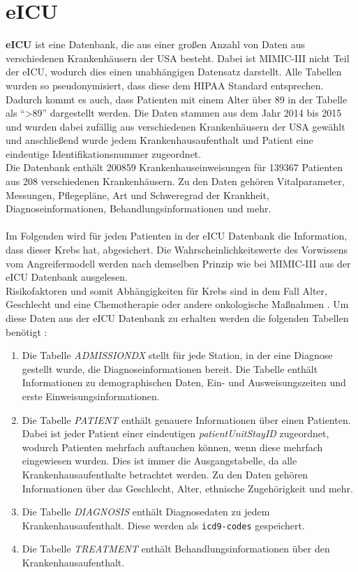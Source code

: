 \documentclass[german,version-2020-11]{uzl-thesis}
\begin{document}
\section{eICU}
\textbf{eICU} ist eine Datenbank, die aus einer großen Anzahl von Daten aus verschiedenen Krankenhäusern der USA besteht. Dabei ist MIMIC-III nicht Teil der eICU, wodurch dies einen unabhängigen Datensatz darstellt. Alle Tabellen wurden so pseudonymisiert, dass diese dem HIPAA Standard entsprechen. Dadurch kommt es auch, dass Patienten mit einem Alter über 89 in der Tabelle als \enquote{>89} dargestellt werden. Die Daten stammen aus dem Jahr 2014 bis 2015 und wurden dabei zufällig aus verschiedenen Krankenhäusern der USA gewählt und anschließend wurde jedem Krankenhausaufenthalt und Patient eine eindeutige Identifikationsnummer zugeordnet. \\ 
Die Datenbank enthält 200859 Krankenhauseinweisungen für 139367 Patienten aus 208 verschiedenen Krankenhäusern. Zu den Daten gehören Vitalparameter, Messungen, Pflegepläne, Art und Schweregrad der Krankheit, Diagnoseinformationen, Behandlungsinformationen und mehr. \\ \\
Im Folgenden wird für jeden Patienten in der eICU Datenbank die Information, dass dieser Krebs hat, abgesichert. Die Wahrscheinlichkeitswerte des Vorwissens vom Angreifermodell werden nach demselben Prinzip wie bei MIMIC-III aus der eICU Datenbank ausgelesen. \\ 
Risikofaktoren und somit Abhängigkeiten für Krebs sind in dem Fall Alter, Geschlecht und eine Chemotherapie oder andere onkologische Maßnahmen \cite{13,14}. Um diese Daten aus der eICU Datenbank zu erhalten werden die folgenden Tabellen benötigt : 
\begin{enumerate}
	\item Die Tabelle \textit{ADMISSIONDX} stellt für jede Station, in der eine Diagnose gestellt wurde, die Diagnoseinformationen bereit. Die Tabelle enthält Informationen zu demographischen Daten, Ein- und Ausweisungszeiten und erste Einweisungsinformationen.
	\item Die Tabelle \textit{PATIENT} enthält genauere Informationen über einen Patienten.  Dabei ist jeder Patient einer eindeutigen \textit{patientUnitStayID} zugeordnet, wodurch Patienten mehrfach auftauchen können, wenn diese mehrfach eingewiesen wurden. Dies ist immer die Ausgangstabelle, da alle Krankenhausaufenthalte betrachtet werden. Zu den Daten gehören Informationen über das Geschlecht, Alter, ethnische Zugehörigkeit und mehr.
	\item Die Tabelle \textit{DIAGNOSIS} enthält Diagnosedaten zu jedem Krankenhausaufenthalt. Diese werden als \texttt{icd9-codes} gespeichert.
	\item Die Tabelle \textit{TREATMENT } enthält Behandlungsinformationen über den Krankenhausaufenthalt.
\end{enumerate} 
\end{document}
